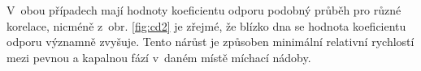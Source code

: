 
 V~obou případech mají hodnoty koeficientu odporu podobný průběh pro různé korelace, nicméně z~obr. \ref{fig:cd2} je zřejmé, že blízko dna se hodnota koeficientu odporu významně zvyšuje. Tento nárůst je způsoben minimální relativní rychlostí mezi pevnou a kapalnou fází v~daném místě míchací nádoby.
